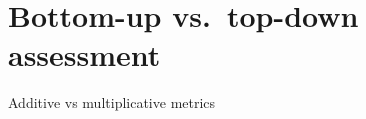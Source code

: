 \section{Bottom-up vs.~top-down assessment}
\label{section:related-work:bottom-up}


Additive vs multiplicative metrics
